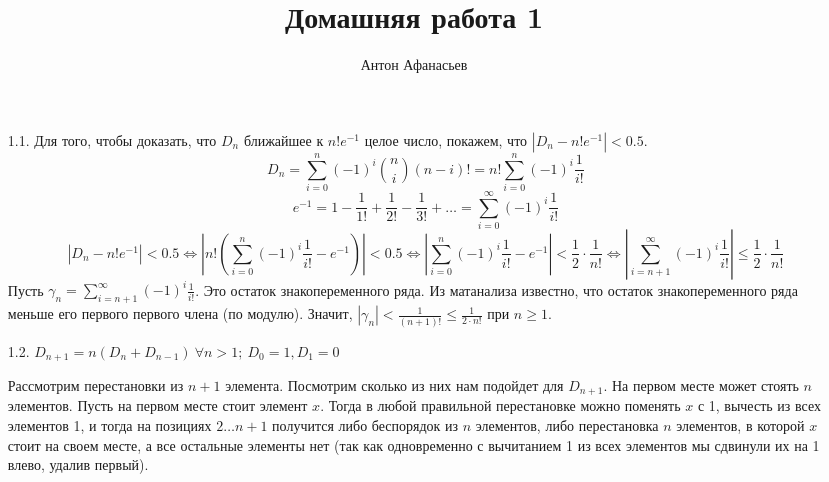 \documentclass[10pt]{article}
\begin{document}
\title{Домашняя работа 1}
\author{Антон Афанасьев}
\maketitle

\begin{enumerate}
\item[1.1.] Для того, чтобы доказать, что $D_n$ ближайшее к $n!e^{-1}$ целое число, покажем, что $|D_n - n!e^{-1}| < 0.5$.
$$D_n = \sum_{i=0}^n (-1)^i \binom{n}{i} (n-i)! = n! \sum_{i=0}^n (-1)^i \frac{1}{i!}$$
$$e^{-1} = 1 - \frac{1}{1!} + \frac{1}{2!} - \frac{1}{3!} + \ldots = \sum_{i=0}^\infty (-1)^i \frac{1}{i!}$$
$$\left | D_n - n!e^{-1} \right | < 0.5 \Leftrightarrow 
\left |n! \left ( \sum_{i=0}^n (-1)^i \frac{1}{i!} - e^{-1} \right ) \right | < 0.5 \Leftrightarrow
\left |\sum_{i=0}^n (-1)^i \frac{1}{i!} - e^{-1} \right | < \frac{1}{2} \cdot \frac{1}{n!} \Leftrightarrow
\left |\sum_{i=n+1}^\infty (-1)^i \frac{1}{i!} \right | \le \frac{1}{2} \cdot \frac{1}{n!}
$$
Пусть $\gamma_n = \sum_{i=n+1}^\infty (-1)^i \frac{1}{i!}$. Это остаток знакопеременного ряда. Из матанализа известно, что остаток знакопеременного ряда меньше его первого первого члена (по модулю). Значит, $|\gamma_n| < \frac{1}{(n+1)!} \le \frac{1}{2 \cdot n!}$ при $n \ge 1$. 

\item[1.2.] $D_{n+1} = n ( D_n + D_{n-1})\ \forall n > 1;\ D_0 = 1, D_1 = 0$

Рассмотрим перестановки из $n+1$ элемента. Посмотрим сколько из них нам подойдет для $D_{n+1}$. На первом месте может стоять $n$ элементов. Пусть на первом месте стоит элемент $x$. Тогда в любой правильной перестановке можно поменять $x$ с 1, вычесть из всех элементов 1, и тогда на позициях $2 \ldots n+1$ получится либо беспорядок из $n$ элементов, либо перестановка $n$ элементов, в которой $x$ стоит на своем месте, а все остальные элементы нет (так как одновременно с вычитанием 1 из всех элементов мы сдвинули их на 1 влево, удалив первый).


\end{enumerate}
\end{document}
